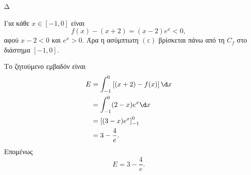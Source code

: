 \begin{thema}{Δ}
\begin{erwthma}
\item Για κάθε $x\in[-1,0]$ είναι
\[
f(x)-(x+2)=(x-2)e^x<0,
\]
αφού $x-2<0$ και $e^x>0$. Άρα η ασύμπτωτη $(\varepsilon)$ βρίσκεται πάνω από τη $C_f$ στο διάστημα $[-1,0]$.

Το ζητούμενο εμβαδόν είναι
\begin{align*}
E
&=\int_{-1}^{0}\left[(x+2)-f(x)\right]\d x\\
&=\int_{-1}^{0}(2-x)e^x\d x\\
&=\left[(3-x)e^x\right]_{-1}^{0}\\
&=3-\frac{4}{e}.
\end{align*}
Επομένως
\[
{E=3-\frac{4}{e}}.
\]
\end{erwthma}
\end{thema}

